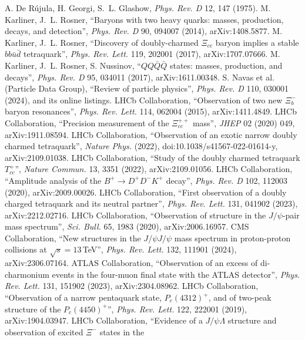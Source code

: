  A. De R\'ujula, H. Georgi, S.~L. Glashow, \emph{Phys. Rev. D} 12, 147 (1975).
 M. Karliner, J.~L. Rosner, ``Baryons with two heavy quarks: masses, production, decays, and detection'',
\emph{Phys. Rev. D} 90, 094007 (2014), arXiv:1408.5877.
 M. Karliner, J.~L. Rosner, ``Discovery of doubly-charmed $\Xi_{cc}$ baryon implies a stable $bb\bar u\bar d$
tetraquark'', \emph{Phys. Rev. Lett.} 119, 202001 (2017), arXiv:1707.07666.
 M. Karliner, J.~L. Rosner, S. Nussinov, ``$QQ\bar Q\bar Q$ states: masses, production, and decays'',
\emph{Phys. Rev. D} 95, 034011 (2017), arXiv:1611.00348.
 S. Navas et al. (Particle Data Group), ``Review of particle physics'', \emph{Phys. Rev. D} 110, 030001 (2024), and its
online listings.
 LHCb Collaboration, ``Observation of two new $\Xi_b^-$ baryon resonances'', \emph{Phys. Rev. Lett.} 114, 062004
(2015), arXiv:1411.4849.
 LHCb Collaboration, ``Precision measurement of the $\Xi_{cc}^{++}$ mass'', \emph{JHEP} 02 (2020) 049,
arXiv:1911.08594.
 LHCb Collaboration, ``Observation of an exotic narrow doubly charmed tetraquark'', \emph{Nature Phys.} (2022),
doi:10.1038/s41567-022-01614-y, arXiv:2109.01038.
 LHCb Collaboration, ``Study of the doubly charmed tetraquark $T_{cc}^+$'', \emph{Nature Commun.} 13, 3351 (2022),
arXiv:2109.01056.
 LHCb Collaboration, ``Amplitude analysis of the $B^+\to D^+D^-K^+$ decay'', \emph{Phys. Rev. D} 102, 112003 (2020),
arXiv:2009.00026.
 LHCb Collaboration, ``First observation of a doubly charged tetraquark and its neutral partner'', \emph{Phys. Rev.
Lett.} 131, 041902 (2023), arXiv:2212.02716.
 LHCb Collaboration, ``Observation of structure in the $J/\psi$-pair mass spectrum'', \emph{Sci. Bull.} 65, 1983
(2020), arXiv:2006.16957.
 CMS Collaboration, ``New structures in the $J/\psi J/\psi$ mass spectrum in proton-proton collisions at
$\sqrt s=13$\,TeV'', \emph{Phys. Rev. Lett.} 132, 111901 (2024), arXiv:2306.07164.
 ATLAS Collaboration, ``Observation of an excess of di-charmonium events in the four-muon final state with the ATLAS
detector'', \emph{Phys. Rev. Lett.} 131, 151902 (2023), arXiv:2304.08962.
 LHCb Collaboration, ``Observation of a narrow pentaquark state, $P_c(4312)^+$, and of two-peak structure of the
$P_c(4450)^+$'', \emph{Phys. Rev. Lett.} 122, 222001 (2019), arXiv:1904.03947.
 LHCb Collaboration, ``Evidence of a $J/\psi\Lambda$ structure and observation of excited $\Xi^-$ states in the
